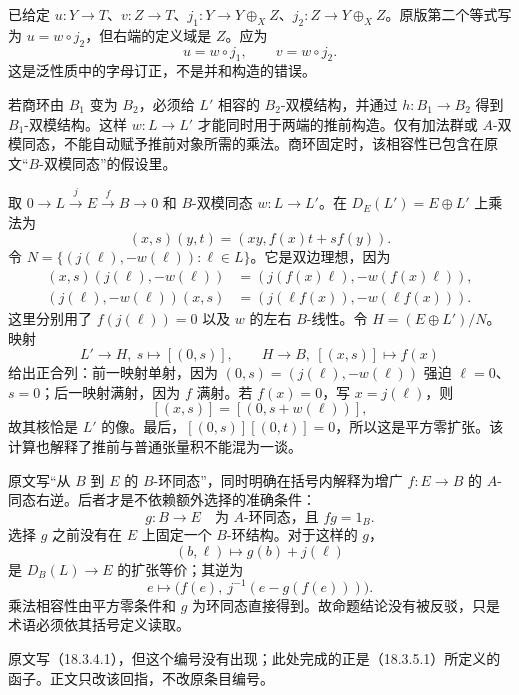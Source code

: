 已给定 $u:Y\to T$、$v:Z\to T$、$j_1:Y\to Y\oplus_XZ$、$j_2:Z\to Y\oplus_XZ$。原版第二个等式写为 $u=w\circ j_2$，但右端的定义域是 $Z$。应为
\[
 u=w\circ j_1,\qquad v=w\circ j_2.
\]
这是泛性质中的字母订正，不是并和构造的错误。

若商环由 $B_1$ 变为 $B_2$，必须给 $L'$ 相容的 $B_2$-双模结构，并通过 $h:B_1\to B_2$ 得到 $B_1$-双模结构。这样 $w:L\to L'$ 才能同时用于两端的推前构造。仅有加法群或 $A$-双模同态，不能自动赋予推前对象所需的乘法。商环固定时，该相容性已包含在原文“$B$-双模同态”的假设里。

取 $0\to L\xrightarrow{j}E\xrightarrow{f}B\to0$ 和 $B$-双模同态 $w:L\to L'$。在 $D_E(L')=E\oplus L'$ 上乘法为
\[
 (x,s)(y,t)=(xy,f(x)t+sf(y)).
\]
令 $N=\{(j(\ell),-w(\ell)):\ell\in L\}$。它是双边理想，因为
\[
\begin{aligned}
 (x,s)(j(\ell),-w(\ell))
  &=(j(f(x)\ell),-w(f(x)\ell)),\\
 (j(\ell),-w(\ell))(x,s)
  &=(j(\ell f(x)),-w(\ell f(x))).
\end{aligned}
\]
这里分别用了 $f(j(\ell))=0$ 以及 $w$ 的左右 $B$-线性。令 $H=(E\oplus L')/N$。映射
\[
 L'\longrightarrow H,\ s\longmapsto[(0,s)],\qquad
 H\longrightarrow B,\ [(x,s)]\longmapsto f(x)
\]
给出正合列：前一映射单射，因为 $(0,s)=(j(\ell),-w(\ell))$ 强迫 $\ell=0$、$s=0$；后一映射满射，因为 $f$ 满射。若 $f(x)=0$，写 $x=j(\ell)$，则
\[
 [(x,s)]=[(0,s+w(\ell))],
\]
故其核恰是 $L'$ 的像。最后，$[(0,s)][(0,t)]=0$，所以这是平方零扩张。该计算也解释了推前与普通张量积不能混为一谈。

原文写“从 $B$ 到 $E$ 的 $B$-环同态”，同时明确在括号内解释为增广 $f:E\to B$ 的 $A$-同态右逆。后者才是不依赖额外选择的准确条件：
\[
 g:B\to E\quad\text{为 $A$-环同态，且 }fg=1_B.
\]
选择 $g$ 之前没有在 $E$ 上固定一个 $B$-环结构。对于这样的 $g$，
\[
 (b,\ell)\longmapsto g(b)+j(\ell)
\]
是 $D_B(L)\to E$ 的扩张等价；其逆为
\[
 e\longmapsto\bigl(f(e),\ j^{-1}(e-g(f(e)))\bigr).
\]
乘法相容性由平方零条件和 $g$ 为环同态直接得到。故命题结论没有被反驳，只是术语必须依其括号定义读取。

原文写（18.3.4.1），但这个编号没有出现；此处完成的正是（18.3.5.1）所定义的函子。正文只改该回指，不改原条目编号。

